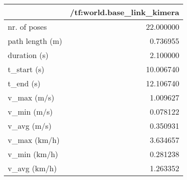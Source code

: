 \begin{tabular}{lr}
\toprule
{} &  /tf:world.base\_link\_kimera \\
\midrule
nr. of poses    &                   22.000000 \\
path length (m) &                    0.736955 \\
duration (s)    &                    2.100000 \\
t\_start (s)     &                   10.006740 \\
t\_end (s)       &                   12.106740 \\
v\_max (m/s)     &                    1.009627 \\
v\_min (m/s)     &                    0.078122 \\
v\_avg (m/s)     &                    0.350931 \\
v\_max (km/h)    &                    3.634657 \\
v\_min (km/h)    &                    0.281238 \\
v\_avg (km/h)    &                    1.263352 \\
\bottomrule
\end{tabular}
